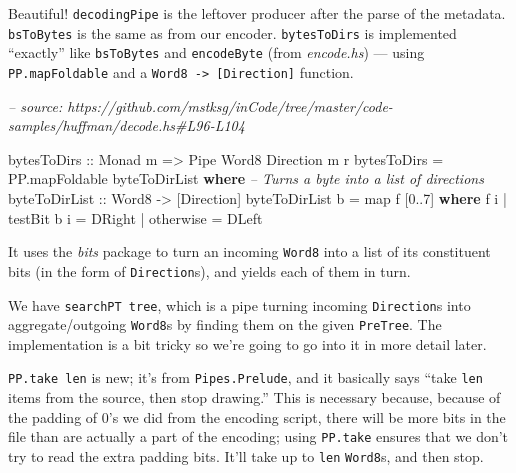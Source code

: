 \documentclass[]{article}
\newenvironment{Shaded}{}{}
\newcommand{\CommentTok}[1]{\textcolor[rgb]{0.38,0.63,0.69}{\textit{#1}}}
\newcommand{\DataTypeTok}[1]{\textcolor[rgb]{0.56,0.13,0.00}{#1}}
\newcommand{\DecValTok}[1]{\textcolor[rgb]{0.25,0.63,0.44}{#1}}
\newcommand{\FunctionTok}[1]{\textcolor[rgb]{0.02,0.16,0.49}{#1}}
\newcommand{\KeywordTok}[1]{\textcolor[rgb]{0.00,0.44,0.13}{\textbf{#1}}}
\newcommand{\NormalTok}[1]{#1}
\newcommand{\OtherTok}[1]{\textcolor[rgb]{0.00,0.44,0.13}{#1}}
\begin{document}
Beautiful! \texttt{decodingPipe} is the leftover producer after the parse of the
metadata. \texttt{bsToBytes} is the same as from our encoder.
\texttt{bytesToDirs} is implemented ``exactly'' like \texttt{bsToBytes} and
\texttt{encodeByte} (from \emph{encode.hs}) --- using \texttt{PP.mapFoldable}
and a \texttt{Word8\ -\textgreater{}\ {[}Direction{]}} function.

\begin{Shaded}
\begin{Highlighting}[]
\CommentTok{-- source: https://github.com/mstksg/inCode/tree/master/code-samples/huffman/decode.hs#L96-L104}

\OtherTok{bytesToDirs ::} \DataTypeTok{Monad}\NormalTok{ m }\OtherTok{=>} \DataTypeTok{Pipe} \DataTypeTok{Word8} \DataTypeTok{Direction}\NormalTok{ m r}
\NormalTok{bytesToDirs }\FunctionTok{=}\NormalTok{ PP.mapFoldable byteToDirList}
  \KeywordTok{where}
    \CommentTok{-- Turns a byte into a list of directions}
\OtherTok{    byteToDirList ::} \DataTypeTok{Word8} \OtherTok{->}\NormalTok{ [}\DataTypeTok{Direction}\NormalTok{]}
\NormalTok{    byteToDirList b }\FunctionTok{=}\NormalTok{ map f [}\DecValTok{0}\FunctionTok{..}\DecValTok{7}\NormalTok{]}
      \KeywordTok{where}
\NormalTok{        f i }\FunctionTok{|}\NormalTok{ testBit b i }\FunctionTok{=} \DataTypeTok{DRight}
            \FunctionTok{|}\NormalTok{ otherwise   }\FunctionTok{=} \DataTypeTok{DLeft}
\end{Highlighting}
\end{Shaded}

It uses the \emph{bits} package to turn an incoming \texttt{Word8} into a list
of its constituent bits (in the form of \texttt{Direction}s), and yields each of
them in turn.

We have \texttt{searchPT\ tree}, which is a pipe turning incoming
\texttt{Direction}s into aggregate/outgoing \texttt{Word8}s by finding them on
the given \texttt{PreTree}. The implementation is a bit tricky so we're going to
go into it in more detail later.

\texttt{PP.take\ len} is new; it's from \texttt{Pipes.Prelude}, and it basically
says ``take \texttt{len} items from the source, then stop drawing.'' This is
necessary because, because of the padding of 0's we did from the encoding
script, there will be more bits in the file than are actually a part of the
encoding; using \texttt{PP.take} ensures that we don't try to read the extra
padding bits. It'll take up to \texttt{len} \texttt{Word8}s, and then stop.
\end{document}
